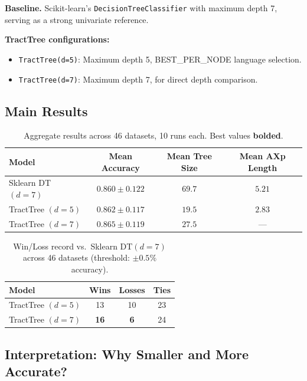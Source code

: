 \documentclass[11pt,a4paper]{article}
\begin{document}
\textbf{Baseline.} Scikit-learn's \texttt{DecisionTreeClassifier} with maximum depth 7, serving as a strong univariate reference.

\textbf{TractTree configurations:}
\begin{itemize}[leftmargin=2em]
    \item \texttt{TractTree(d=5)}: Maximum depth 5, BEST\_PER\_NODE language selection.
    \item \texttt{TractTree(d=7)}: Maximum depth 7, for direct depth comparison.
\end{itemize}

\subsection{Main Results}

\begin{table}[H]
\centering
\caption{Aggregate results across 46 datasets, 10 runs each. Best values \textbf{bolded}.}
\label{tab:results}
\begin{tabular}{@{}lccc@{}}
\toprule
\textbf{Model} & \textbf{Mean Accuracy} & \textbf{Mean Tree Size} & \textbf{Mean AXp Length} \\
\midrule
Sklearn DT $(d\!=\!7)$       & $0.860 \pm 0.122$ & $69.7$ & $5.21$ \\
TractTree $(d\!=\!5)$        & $0.862 \pm 0.117$ & $\mathbf{19.5}$ & $\mathbf{2.83}$ \\
TractTree $(d\!=\!7)$        & $\mathbf{0.865} \pm 0.119$ & $27.5$ & --- \\
\bottomrule
\end{tabular}
\end{table}

\begin{table}[H]
\centering
\caption{Win/Loss record vs.\ Sklearn DT$(d\!=\!7)$  across 46 datasets (threshold: $\pm 0.5\%$ accuracy).}
\label{tab:winloss}
\begin{tabular}{@{}lccc@{}}
\toprule
\textbf{Model} & \textbf{Wins} & \textbf{Losses} & \textbf{Ties} \\
\midrule
TractTree $(d\!=\!5)$ & 13 & 10 & 23 \\
TractTree $(d\!=\!7)$ & \textbf{16} & \textbf{6} & 24 \\
\bottomrule
\end{tabular}
\end{table}

\subsection{Interpretation: Why Smaller and More Accurate?}
\end{document}
